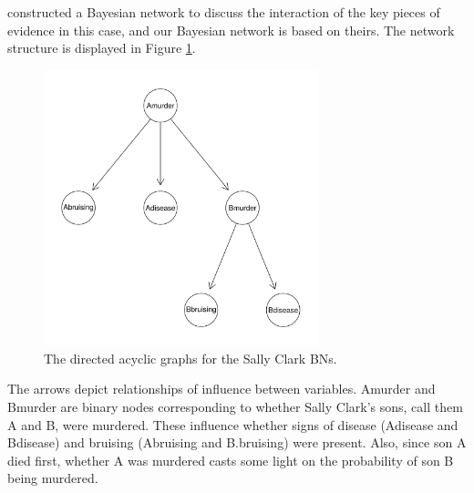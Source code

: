 \documentclass[10pt,]{scrartcl}
\begin{document}
    














\citet{Fenton2018Risk} constructed a Bayesian network to discuss the interaction of the key pieces of evidence in this case, and our Bayesian network is based on theirs.  The network structure is displayed in Figure \ref{fig:sc}.


\begin{figure}
\centering 
    \includegraphics[width = 8cm]{../images/scFullDAG.png}
    \caption{The directed acyclic graphs for the Sally Clark BNs. }
    \label{fig:sc}
\end{figure}



The  arrows  depict  relationships  of  influence  between  variables. \textsf{Amurder} and \textsf{Bmurder} are binary nodes corresponding to whether Sally  Clark’s  sons,   call  them A and B, were murdered. These  influence  whether  signs of disease (\textsf{Adisease} and \textsf{Bdisease}) and bruising (\textsf{Abruising} and \textsf{B.bruising}) were present. Also, since  son A died first, whether A was murdered casts some light on the probability of son B being murdered.
\end{document}
